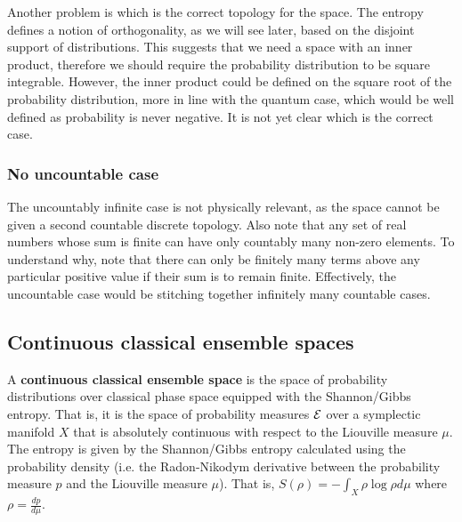 Another problem is which is the correct topology for the space. The entropy defines a notion of orthogonality, as we will see later, based on the disjoint support of distributions. This suggests that we need a space with an inner product, therefore we should require the probability distribution to be square integrable. However, the inner product could be defined on the square root of the probability distribution, more in line with the quantum case, which would be well defined as probability is never negative. It is not yet clear which is the correct case.

\subsubsection{No uncountable case}

The uncountably infinite case is not physically relevant, as the space cannot be given a second countable discrete topology. Also note that any set of real numbers whose sum is finite can have only countably many non-zero elements. To understand why, note that there can only be finitely many terms above any particular positive value if their sum is to remain finite. Effectively, the uncountable case would be stitching together infinitely many countable cases.

\subsection{Continuous classical ensemble spaces}

\begin{defn}
	A \textbf{continuous classical ensemble space} is the space of probability distributions over classical phase space equipped with the Shannon/Gibbs entropy. That is, it is the space of probability measures $\mathcal{E}$ over a symplectic manifold $X$ that is absolutely continuous with respect to the Liouville measure $\mu$. The entropy is given by the Shannon/Gibbs entropy calculated using the probability density (i.e. the Radon-Nikodym derivative between the probability measure $p$ and the Liouville measure $\mu$). That is, $S(\rho) = - \int_X \rho \log \rho d\mu$ where $\rho = \frac{dp}{d\mu}$.
\end{defn}

